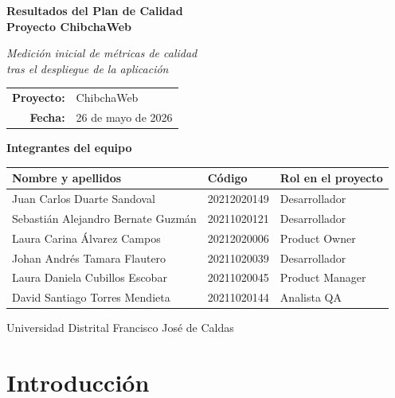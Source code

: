 \documentclass[12pt,a4paper]{article}
\begin{document}
\begin{titlepage}
\centering
\vspace*{2cm}
{\Huge\bfseries Resultados del Plan de Calidad\\[0.4em]
Proyecto ChibchaWeb\par}
\vspace{1.5cm}
{\Large\itshape Medición inicial de métricas de calidad\\tras el despliegue de la aplicación\par}
\vspace{2cm}
{\large
\begin{tabular}{rl}
\textbf{Proyecto:}   & ChibchaWeb \\
\textbf{Fecha:}      & 26 de mayo de 2026 \\
\end{tabular}\par}
\vspace{1.5cm}

{\large\textbf{Integrantes del equipo}\par}
\vspace{0.5cm}
\begin{tabular}{lll}
\toprule
\textbf{Nombre y apellidos} & \textbf{Código} & \textbf{Rol en el proyecto} \\
\midrule
Juan Carlos Duarte Sandoval & 20212020149 & Desarrollador \\
Sebastián Alejandro Bernate Guzmán & 20211020121 & Desarrollador \\
Laura Carina Álvarez Campos & 20212020006 & Product Owner \\
Johan Andrés Tamara Flautero & 20211020039 & Desarrollador \\
Laura Daniela Cubillos Escobar & 20211020045 & Product Manager \\
David Santiago Torres Mendieta & 20211020144 & Analista QA \\
\bottomrule
\end{tabular}

\vfill
{\small Universidad Distrital Francisco José de Caldas}
\end{titlepage}

\tableofcontents
\newpage

\section{Introducción}
\end{document}
